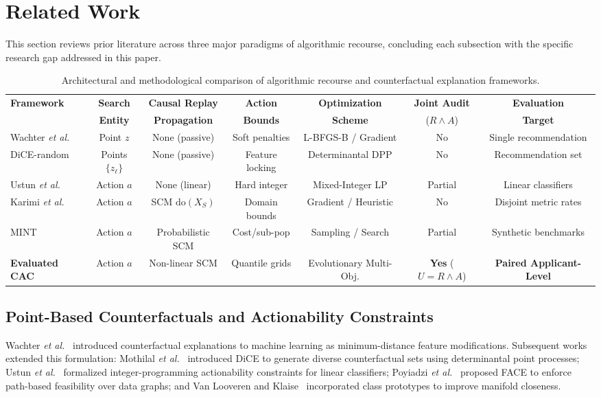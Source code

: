 \documentclass[nolineno]{paper/ieee-access/ieeeaccess}%
\newcommand{\CAC}{CAC}
\begin{document}
\section{Related Work}
\label{sec:related}
This section reviews prior literature across three major paradigms of algorithmic recourse, concluding each subsection with the specific research gap addressed in this paper.

\begin{table}[t]
\caption{Architectural and methodological comparison of algorithmic recourse and counterfactual explanation frameworks.}
\label{tab:comparison}
\centering\footnotesize
\begin{tabular}{lcccccc}
\toprule
\textbf{Framework} & \textbf{Search} & \textbf{Causal Replay} & \textbf{Action} & \textbf{Optimization} & \textbf{Joint Audit} & \textbf{Evaluation} \\
 & \textbf{Entity} & \textbf{Propagation} & \textbf{Bounds} & \textbf{Scheme} & ($R \land A$) & \textbf{Target} \\
\midrule
Wachter \emph{et al.}~\cite{wachter2017counterfactual} & Point $z$ & None (passive) & Soft penalties & L-BFGS-B / Gradient & No & Single recommendation \\
DiCE-random~\cite{mothilal2020dice} & Points $\{z_\ell\}$ & None (passive) & Feature locking & Determinantal DPP & No & Recommendation set \\
Ustun \emph{et al.}~\cite{ustun2019actionable} & Action $a$ & None (linear) & Hard integer & Mixed-Integer LP & Partial & Linear classifiers \\
Karimi \emph{et al.}~\cite{karimi2021recourse} & Action $a$ & SCM $\mathrm{do}(X_S)$ & Domain bounds & Gradient / Heuristic & No & Disjoint metric rates \\
MINT~\cite{karimi2020imperfect} & Action $a$ & Probabilistic SCM & Cost/sub-pop & Sampling / Search & Partial & Synthetic benchmarks \\
\rowcolor{AccessPale}
\textbf{Evaluated \CAC{}} & Action $a$ & Non-linear SCM & Quantile grids & Evolutionary Multi-Obj. & \textbf{Yes} ($U=R \land A$) & \textbf{Paired Applicant-Level} \\
\bottomrule
\end{tabular}
\end{table}

\subsection{Point-Based Counterfactuals and Actionability Constraints}
Wachter \emph{et al.}~\cite{wachter2017counterfactual} introduced counterfactual explanations to machine learning as minimum-distance feature modifications. Subsequent works extended this formulation: Mothilal \emph{et al.}~\cite{mothilal2020dice} introduced DiCE to generate diverse counterfactual sets using determinantal point processes; Ustun \emph{et al.}~\cite{ustun2019actionable} formalized integer-programming actionability constraints for linear classifiers; Poyiadzi \emph{et al.}~\cite{poyiadzi2020face} proposed FACE to enforce path-based feasibility over data graphs; and Van Looveren and Klaise~\cite{vanlooveren2021interpretable} incorporated class prototypes to improve manifold closeness.
\end{document}
